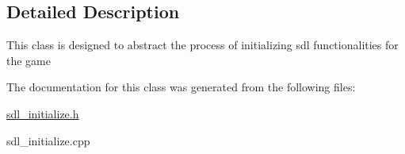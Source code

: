 \subsection{Detailed Description}
This class is designed to abstract the process of initializing sdl functionalities for the game 

The documentation for this class was generated from the following files\+:\begin{DoxyCompactItemize}
\item 
\hyperlink{sdl__initialize_8h}{sdl\+\_\+initialize.\+h}\item 
sdl\+\_\+initialize.\+cpp\end{DoxyCompactItemize}
